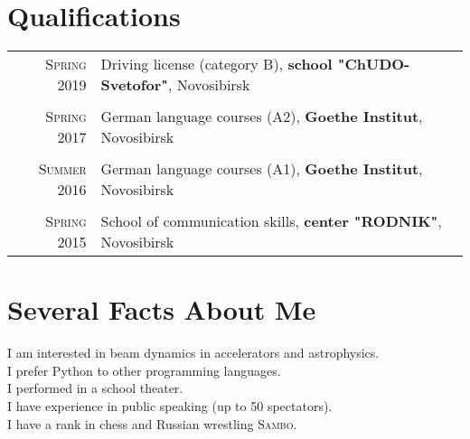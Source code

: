 \documentclass[a4paper,12pt]{article}
\begin{document}
\section{Qualifications}
\begin{tabular}{rl}	
\textsc{Spring} 2019 & Driving license (category B), \textbf{school "ChUDO-Svetofor"}, Novosibirsk\\&\\
\textsc{Spring} 2017& German language courses (A2), \textbf{Goethe Institut}, Novosibirsk\\&\\
\textsc{Summer} 2016& German language courses (A1), \textbf{Goethe Institut}, Novosibirsk\\&\\
\textsc{Spring} 2015& School of communication skills, \textbf{ center "RODNIK"}, Novosibirsk\\
\end{tabular}


\section{Several Facts About Me}
I am interested in beam dynamics in accelerators and astrophysics.\\
I prefer Python to other programming languages.\\
I performed in a school theater.\\
I have experience in public speaking (up to 50 spectators).\\
I have a rank in chess and Russian wrestling \textsc{Sambo}.\\

\end{document}
